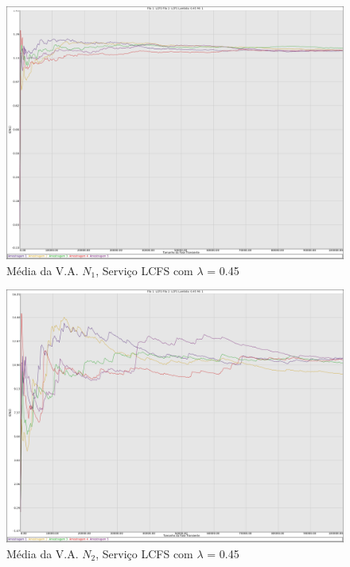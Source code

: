 \documentclass[a4paper,10pt]{article}
\begin{document}
\begin{figure}
	\caption{Média da V.A. $N_1$, Serviço LCFS com $\lambda$ = 0.45}
	\label{figTransienteLCFSfila1N}
	\includegraphics[scale = 0.20]{./graficos_transiente_1/LCFS/01.png}
\end{figure}

\begin{figure}
	\caption{Média da V.A. $N_2$, Serviço LCFS com $\lambda$ = 0.45}
	\label{figTransienteLCFSfila2N}
	\includegraphics[scale = 0.20]{./graficos_transiente_1/LCFS/02.png}
\end{figure}
\end{document}
